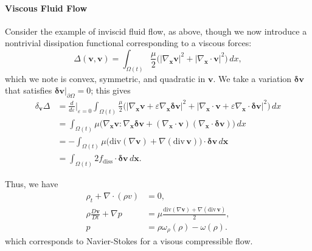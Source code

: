 \documentclass[final,10pt]{article}
\begin{document}
\paragraph{Viscous Fluid Flow}
Consider the example of inviscid fluid flow, as above, though we now introduce a nontrivial dissipation functional corresponding to a viscous forces:
\[
	\Delta(\bm v, \bm v)	=	\int_{\Omega(t)} \frac{\mu}{2} \big( | \nabla_{\bm x} \bm v|^2 + | \nabla_{\bm x}\cdot \bm v|^2 \big) \, dx,
\]
which we note is convex, symmetric, and quadratic in $\bm v$.
We take a variation $\bm\delta\bm v$ that satisfies $\bm \delta\bm v\big|_{\partial\Omega}=0$;
this gives
\begin{align*}
	\delta_{\bm v} \Delta	&=	\frac{d}{d\varepsilon}\bigg|_{\varepsilon=0} 
					\int_{\Omega(t)} \frac{\mu}{2} \big( | \nabla_{\bm x} \bm v + \varepsilon\nabla_{\bm x} \bm\delta\bm v|^2 
									+ |\nabla_{\bm x} \cdot\bm v + \varepsilon\nabla_{\bm x} \cdot\bm\delta\bm v|^2 \big) \, dx\\
				&=	\int_{\Omega(t)} \mu \big( \nabla_{\bm x} \bm v:\nabla_{\bm x} \bm\delta\bm v
									+ (\nabla_{\bm x} \cdot\bm v )(\nabla_{\bm x} \cdot\bm\delta\bm v) \big) \, dx\\
				&=	-\int_{\Omega(t)} \mu \big( \mathrm{div}(\nabla \bm v) + \nabla(\mathrm{div}\,\bm v) \big) \cdot \bm\delta\bm v\, d\bm x\\
				&=	\int_{\Omega(t)} 2f_\mathrm{diss}\cdot \bm\delta\bm v\, d\bm x.
\end{align*}

Thus, we have
\begin{align}
	\rho_t + \nabla \cdot(\rho v)		&= 0,	\tag{Conservation of Mass}\\
	{\rho} \frac{D\bm v}{D t} + \nabla p	&= \mu \frac{\mathrm{div}(\nabla \bm v) + \nabla(\mathrm{div}\,\bm v)}{2},	\tag{Force Balance}\\
							p	&=\rho\omega_\rho({\rho}) - \omega(\rho).
															\tag{Equation of State}
\end{align}
which corresponds to Navier-Stokes for a visous compressible flow.
\end{document}
